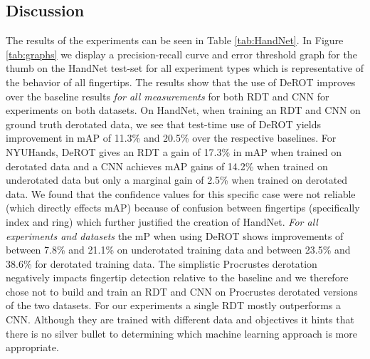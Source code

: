 \documentclass{bmvc2k}
\begin{document}
\subsection{Discussion}\label{sec:discussion}
The results of the experiments can be seen in Table \ref{tab:HandNet}. In Figure \ref{tab:graphs} we display a precision-recall curve and error threshold graph for the thumb on the HandNet test-set for all experiment types which is representative of the behavior of all fingertips. The results show that the use of DeROT improves over the baseline results \emph{for all measurements} for both RDT and CNN for experiments on both datasets. On HandNet, when training an RDT and CNN on ground truth derotated data, we see that test-time use of DeROT yields improvement in mAP of 11.3\% and 20.5\% over the respective baselines. For NYUHands, DeROT gives an RDT a gain of 17.3\% in mAP when trained on derotated data and a CNN achieves mAP gains of 14.2\% when trained on underotated data but only a marginal gain of 2.5\% when trained on derotated data. We found that the confidence values for this specific case were not reliable (which directly effects mAP) because of confusion between fingertips (specifically index and ring) which further justified the creation of HandNet. \emph{For all experiments and datasets} the mP when using DeROT shows improvements of between 7.8\% and 21.1\% on underotated training data and between 23.5\% and 38.6\% for derotated training data. The simplistic Procrustes derotation negatively impacts fingertip detection relative to the baseline and we therefore chose not to build and train an RDT and CNN on Procrustes derotated versions of the two datasets. For our experiments a single RDT mostly outperforms a CNN. Although they are trained with different data and objectives it hints that there is no silver bullet to determining which machine learning approach is more appropriate.

\end{document}
